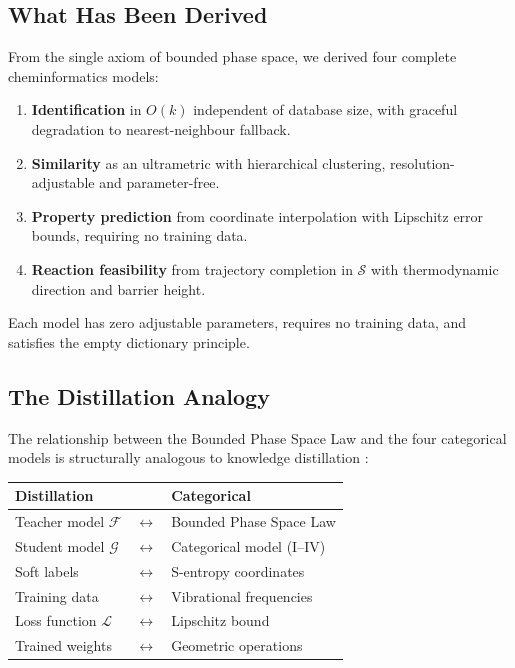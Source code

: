 \documentclass[11pt,twocolumn,a4paper]{article}
\theoremstyle{definition}
\theoremstyle{remark}
\newcommand{\Sspace}{\mathcal{S}}
\newcommand{\Teacher}{\mathcal{F}}
\newcommand{\Student}{\mathcal{G}}
\newcommand{\Loss}{\mathcal{L}}
\begin{document}
\subsection{What Has Been Derived}

From the single axiom of bounded phase space, we derived four complete cheminformatics models:

\begin{enumerate}[nosep]
\item \textbf{Identification} in $O(k)$ independent of database size, with graceful degradation to nearest-neighbour fallback.
\item \textbf{Similarity} as an ultrametric with hierarchical clustering, resolution-adjustable and parameter-free.
\item \textbf{Property prediction} from coordinate interpolation with Lipschitz error bounds, requiring no training data.
\item \textbf{Reaction feasibility} from trajectory completion in $\Sspace$ with thermodynamic direction and barrier height.
\end{enumerate}

Each model has zero adjustable parameters, requires no training data, and satisfies the empty dictionary principle.

\subsection{The Distillation Analogy}

The relationship between the Bounded Phase Space Law and the four categorical models is structurally analogous to knowledge distillation \citep{hinton2015}:

\begin{center}
\begin{tabular}{lcl}
\textbf{Distillation} & & \textbf{Categorical} \\
\midrule
Teacher model $\Teacher$ & $\leftrightarrow$ & Bounded Phase Space Law \\
Student model $\Student$ & $\leftrightarrow$ & Categorical model (I--IV) \\
Soft labels & $\leftrightarrow$ & S-entropy coordinates \\
Training data & $\leftrightarrow$ & Vibrational frequencies \\
Loss function $\Loss$ & $\leftrightarrow$ & Lipschitz bound \\
Trained weights & $\leftrightarrow$ & Geometric operations \\
\end{tabular}
\end{center}
\end{document}
